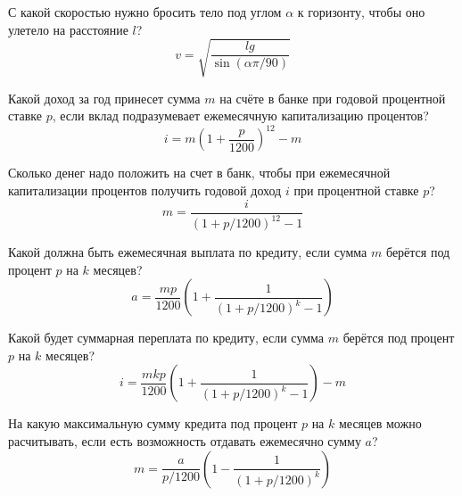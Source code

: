 
\begin{zztask}
С какой скоростью нужно бросить тело под углом $\alpha$ к горизонту,
чтобы оно улетело на расстояние $l$?
%
\[
v = \sqrt{\frac{lg}{\sin(\alpha\pi/90)}}
\]
\end{zztask}


\begin{zztask}
Какой доход за год принесет сумма $m$ на счёте в банке при годовой
процентной ставке $p$, если вклад подразумевает ежемесячную
капитализацию процентов?
%
\[
i = m \left(1 + \frac{p}{1200}\right)^{12} - m
\]
\end{zztask}


\begin{zztask}
Сколько денег надо положить на счет в банк, чтобы при ежемесячной
капитализации процентов получить годовой доход $i$ при процентной
ставке $p$?
%
\[
m = \frac{i}{\left(1 + p/1200\right)^{12} - 1}
\]
\end{zztask}


\begin{zztask}
Какой должна быть ежемесячная выплата по кредиту, если сумма $m$ берётся 
под процент $p$ на $k$ месяцев?
%
\[
a = \frac{mp}{1200}\left(1 + \frac{1}{(1 + p/1200)^k - 1}\right)
\]
\end{zztask}


\begin{zztask}
Какой будет суммарная переплата по кредиту, если сумма $m$ берётся
под процент $p$ на $k$ месяцев?
%
\[
i = \frac{mkp}{1200}\left(1 + \frac{1}{(1 + p/1200)^k - 1}\right) - m
\]
\end{zztask}


\begin{zztask}
На какую максимальную сумму кредита под процент $p$ на $k$ месяцев
можно расчитывать, если есть возможность отдавать ежемесячно сумму $a$?
%
\[
m = \frac{a}{p/1200}\left(1 - \frac{1}{(1 + p/1200)^k}\right)
\]
\end{zztask}


